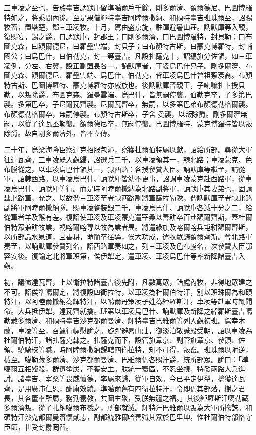 \begin{pinyinscope}
三車凌之至也，告族臺吉訥默庫留準噶爾戶千餘，剛多爾濟、額爾德尼、巴圖博羅特如之，將乘間內徙。至是果偕輝特臺吉阿睦爾撒納、和碩特臺吉班珠爾至，詔賜牧畜，置塔楚，鄰三車凌牧。十月，駕由盛京旋，駐蹕避暑山莊。訥默庫等入覲，復賜宴，錫之爵。曰訥默庫，封郡王；曰剛多爾濟，曰巴圖博羅特，封貝勒；曰布圖克森，曰額爾德尼，曰羅壘雲端，封貝子；曰布顏特古斯，曰蒙克博羅特，封輔國公；曰烏巴什，曰伯勒克，封一等臺吉。凡設扎薩克十，詔編旗分佐領，如三車凌例，分左、右翼，設正副盟長各一。訥默庫者，車凌烏巴什兄子。剛多爾濟、布圖克森、額爾德尼、羅壘雲端、烏巴什、伯勒克，皆車凌烏巴什曾祖察袞裔。布顏特古斯、巴圖博羅特、蒙克博羅特亦戚族也。後訥默庫晉親王，子喇嘛扎卜授貝勒，以叛除爵。布圖克森、羅壘雲端、烏巴什，皆無嗣停襲。伯勒克卒，子多第巴襲。多第巴卒，子尼爾瓦齊襲。尼爾瓦齊卒，無嗣，以多第巴弟布顏德勒格爾襲。布顏德勒格爾卒，無嗣停襲。布顏特古斯卒，子舍夌襲，以叛除爵。剛多爾濟無嗣，以從子達瓦丕勒襲。額爾德尼卒，無嗣停襲。巴圖博羅特、蒙克博羅特皆以叛除爵。故自剛多爾濟外，皆不立傳。

二十年，烏梁海降臣察達克招服包沁，察獲杜爾伯特屬以獻，詔給所部。尋從大軍征達瓦齊。三車凌既入覲歸，詔選兵二千，以車凌領其一，隸北路；車凌蒙克、色布騰從之，以車凌烏巴什領其一，隸西路：各授參贊大臣。訥默庫等繼至，請從軍，詔隸西路。以車凌烏巴什、訥默庫皆幼不更事，詔調車凌蒙克赴西路軍，從車凌烏巴什、訥默庫等行。而是時阿睦爾撒納為北路副將軍，訥默庫其妻弟也，固請隸北路軍，允之。以故偕三車凌至者隸西路副將軍薩拉勒隊，偕訥默庫至者隸北路副將軍阿睦爾撒納隊。賜車凌整裝銀二千，車凌烏巴什、訥默庫各減十分之二，給從軍者羊及餱有差。復詔使車凌及車凌蒙克遣宰桑以善耕卒百赴額爾齊斯，蓋杜爾伯特眾兼耕牧業，視喀爾喀專以牧為業者異。將遣綠旗及喀爾喀兵屯耕額爾齊斯，以所部識水泉道，且善耕，命簡卒往導，俟大功成，遣牧眾歸額爾齊斯。會北路軍奏至，以訥默庫參贊列名，詔西路軍奏如之，列三車凌及色布騰名，次參贊大臣鄂容安後。復諭定北將軍班第，俟伊犁定，遣車凌、車凌烏巴什等率新降諸臺吉入覲。

初，議徵達瓦齊，上以衛拉特諸臺吉後先附，凡數萬眾，錯處內牧，非得地眾建之不可。詔俟準噶爾定，將復設四衛拉特，以車凌為杜爾伯特汗，別以班珠爾為和碩特汗，以阿睦爾撒納為輝特汗，以噶爾丹策凌子姓為綽羅斯汗。車凌等赴軍時輒聞命。大兵抵伊犁，達瓦齊就擒。班第以車凌烏巴什、訥默庫及新降之綽羅斯臺吉噶勒藏多爾濟、和碩特臺吉沙克都爾曼濟、輝特臺吉巴雅爾等列入覲初班。駕幸木蘭，車凌等至，召覲行幄慰諭之。旋蹕避暑山莊，御淡泊敬誠殿受朝，詔以車凌為杜爾伯特汗，諸扎薩克隸之。扎薩克而下，設管旗章京、副管旗章京、參領、佐領、驍騎校等職。時阿睦爾撒納覬轄四衛拉特，知不可得，叛竄。班珠爾以附逆，械至。噶勒藏多爾濟、沙克都爾曼濟、巴雅爾仍各賜汗爵，統所部眾。諭曰：「準噶爾互相殘殺，群遭塗炭，不獲安生。朕統一寰區，不忍坐視，特發兩路大兵進討。諸臺吉、宰桑等畏威懷德，率屬來歸，從軍自效。今已平定伊犁，擒獲達瓦齊，是用廣沛仁恩，酬庸效績。準噶爾舊有四衛拉特汗，令即仍其部落，樹之君長，其各董率所屬，務勤養教，共圖生聚，受朕無疆之福。」其後綽羅斯汗噶勒藏多爾濟叛，從子扎納噶爾布戮之，所部就滅。輝特汗巴雅爾以叛為大軍所擒誅。和碩特汗沙克都爾曼濟懷貳志，副都統雅爾哈善殲其眾於巴里坤。惟杜爾伯特部恪守臣節，世受封爵罔替。


\end{pinyinscope}
